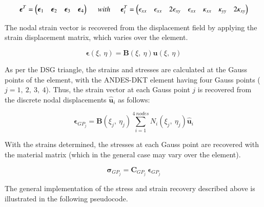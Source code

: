 \begin{equation} 
\boldsymbol{\epsilon}^T = \begin{pmatrix}
\boldsymbol{\epsilon}_1 & \boldsymbol{\epsilon}_2 & \boldsymbol{\epsilon}_3 & \boldsymbol{\epsilon}_4
\end{pmatrix}
\hspace{5mm}
with
\hspace{5mm}
\boldsymbol{\epsilon}^T_i = \begin{pmatrix}
\epsilon_{xx} & \epsilon_{xx} & 2\epsilon_{xy} & \epsilon_{xx} & \kappa_{xx} & \kappa_{yy} & 2\kappa_{xy} 
\end{pmatrix}
\label{eqqrec1}
\end{equation}

The nodal strain vector is recovered from the displacement field by applying the strain displacement matrix, which varies over the element.

\begin{equation} 
\boldsymbol{\epsilon}(\xi,\ \eta) = \mathbf{B}(\xi,\ \eta) \mathbf{u}(\xi,\ \eta)
\label{eqqrec2}
\end{equation}

As per the DSG triangle, the strains and stresses are calculated at the Gauss points of the element, with the ANDES-DKT element having four Gauss points ($j = 1,\ 2,\ 3,\ 4$). Thus, the strain vector at each Gauss point $j$ is recovered from the discrete nodal displacements $\hat{\mathbf{u}}_i$ as follows:

\begin{equation} 
\boldsymbol{\epsilon}_{GP_j} = \mathbf{B}(\xi_j,\ \eta_j) \sum_{i=1}^{4\ nodes} N_i(\xi_j,\ \eta_j) \hat{\mathbf{u}}_i
\label{eqqrec3}
\end{equation}

With the strains determined, the stresses at each Gauss point are recovered with the material matrix (which in the general case may vary over the element).

\begin{equation} 
\boldsymbol{\sigma}_{GP_j} = \mathbf{C}_{GP_j}\ \boldsymbol{\epsilon}_{GP_j}
\label{eqqrec4}
\end{equation}

The general implementation of the stress and strain recovery described above is illustrated in the following pseudocode.

